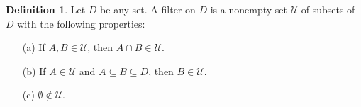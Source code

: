 \documentclass[12pt]{report}
\newcommand{\pf}{{\mathcal P}_f}
\theoremstyle{definition}
\newtheorem{defin}[thm]{Definition}
\begin{document}





 

\begin{defin}\label{HS 3.1}
Let $D$ be any set.  A filter on $D$ is a nonempty set $\mathcal U$ 
of subsets of $D$ with the following properties:
\begin{itemize}
\item[(a)] If $A,B \in \mathcal U$, then $A\cap B \in 
\mathcal U$.
\item[(b)] If $A\in\mathcal U$ and $A\subseteq B\subseteq D$,
then $B\in\mathcal U$.
\item[(c)] $\emptyset\notin\mathcal U$.
\end{itemize} 
\end{defin}
\end{document}
